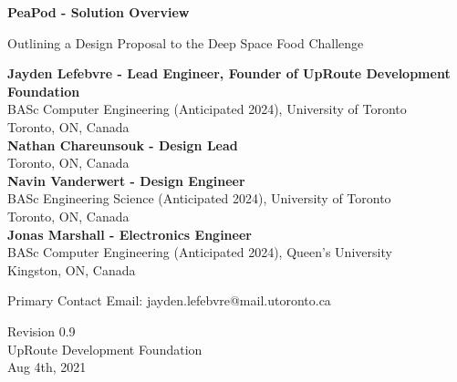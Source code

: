 \documentclass{report}
\begin{document}
\begin{titlepage}
    \begin{center}
        \vspace*{1.2cm}

        \textbf{\large{PeaPod - Solution Overview}}

        \vspace{0.5cm}

        Outlining a Design Proposal to the Deep Space Food Challenge

        \vfill \small{

            \textbf{Jayden Lefebvre - Lead Engineer, Founder of UpRoute Development Foundation}\\
            BASc Computer Engineering (Anticipated 2024), University of Toronto\\
            Toronto, ON, Canada\\
            \vspace{.5cm}
            \textbf{Nathan Chareunsouk - Design Lead}\\Toronto, ON, Canada\\
            \vspace{.5cm}
            \textbf{Navin Vanderwert - Design Engineer}\\
            BASc Engineering Science (Anticipated 2024), University of Toronto\\
            Toronto, ON, Canada\\
            \vspace{.5cm}
            \textbf{Jonas Marshall - Electronics Engineer}\\
            BASc Computer Engineering (Anticipated 2024), Queen's University\\
            Kingston, ON, Canada

        }

        \vspace{1cm}

        Primary Contact Email: jayden.lefebvre@mail.utoronto.ca

        \vspace{.75cm}

        Revision 0.9\\
        UpRoute Development Foundation\\
        Aug 4th, 2021

    \end{center}
\end{titlepage}

\thispagestyle{plain}
\end{document}
